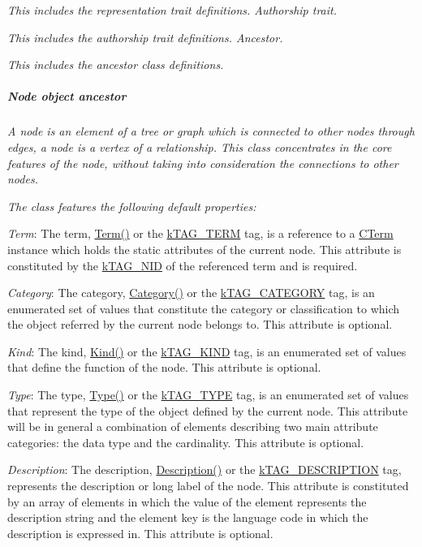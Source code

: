 {\itshape This includes the representation trait definitions. Authorship trait.}

{\itshape This includes the authorship trait definitions. Ancestor.}

{\itshape This includes the ancestor class definitions. \subparagraph*{Node object ancestor}}

{\itshape }

{\itshape A node is an element of a tree or graph which is connected to other nodes through edges, a node is a vertex of a relationship. This class concentrates in the core features of the node, without taking into consideration the connections to other nodes.}

{\itshape The class features the following default properties\-:}

{\itshape 
\begin{DoxyItemize}
\item {\itshape Term}\-: The term, {\ttfamily \hyperlink{}{Term()}} or the {\ttfamily \hyperlink{}{k\-T\-A\-G\-\_\-\-T\-E\-R\-M}} tag, is a reference to a \hyperlink{class_c_term}{C\-Term} instance which holds the static attributes of the current node. This attribute is constituted by the \hyperlink{}{k\-T\-A\-G\-\_\-\-N\-I\-D} of the referenced term and is required. 
\item {\itshape Category}\-: The category, {\ttfamily \hyperlink{}{Category()}} or the {\ttfamily \hyperlink{}{k\-T\-A\-G\-\_\-\-C\-A\-T\-E\-G\-O\-R\-Y}} tag, is an enumerated set of values that constitute the category or classification to which the object referred by the current node belongs to. This attribute is optional. 
\item {\itshape Kind}\-: The kind, {\ttfamily \hyperlink{}{Kind()}} or the {\ttfamily \hyperlink{}{k\-T\-A\-G\-\_\-\-K\-I\-N\-D}} tag, is an enumerated set of values that define the function of the node. This attribute is optional. 
\item {\itshape Type}\-: The type, {\ttfamily \hyperlink{}{Type()}} or the {\ttfamily \hyperlink{}{k\-T\-A\-G\-\_\-\-T\-Y\-P\-E}} tag, is an enumerated set of values that represent the type of the object defined by the current node. This attribute will be in general a combination of elements describing two main attribute categories\-: the data type and the cardinality. This attribute is optional. 
\item {\itshape Description}\-: The description, {\ttfamily \hyperlink{}{Description()}} or the {\ttfamily \hyperlink{}{k\-T\-A\-G\-\_\-\-D\-E\-S\-C\-R\-I\-P\-T\-I\-O\-N}} tag, represents the description or long label of the node. This attribute is constituted by an array of elements in which the value of the element represents the description string and the element key is the language code in which the description is expressed in. This attribute is optional. 
\end{DoxyItemize}}

